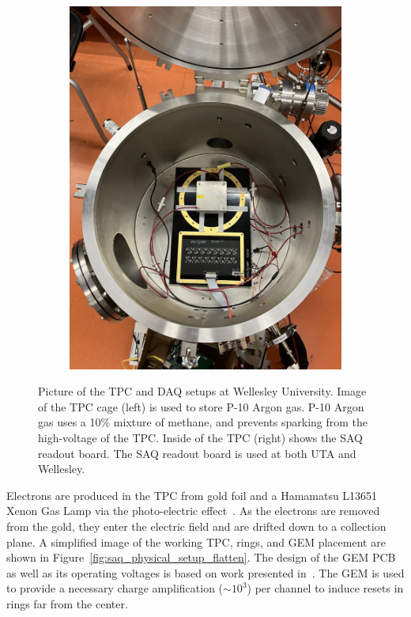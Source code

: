 \begin{figure}[]
\begin{subfigure}{.5\textwidth}
  \includegraphics[width=\textwidth]{images/saq_wellesley_tpc_daq.jpg}
  \caption{}
\end{subfigure}
\caption{Picture of the TPC and DAQ setups at Wellesley University.
Image of the TPC cage (left) is used to store P-10 Argon gas. P-10 Argon gas uses a 10\% mixture of methane, and prevents sparking from the high-voltage of the TPC.
Inside of the TPC (right) shows the SAQ readout board.
The SAQ readout board is used at both UTA and Wellesley.
}
\label{fig:wellesley_tpc}
\end{figure}

Electrons are produced in the TPC from gold foil and a Hamamatsu L13651~\citep{hamamatsu_tls1023e} Xenon Gas Lamp via the photo-electric effect~\citep{https://doi.org/10.1002/andp.19053220607}.
As the electrons are removed from the gold, they enter the electric field and are drifted down to a collection plane.
A simplified image of the working TPC, rings, and GEM placement are shown in Figure~\ref{fig:saq_physical_setup_flatten}.
The design of the GEM PCB as well as its operating voltages is based on work presented in~\citep{THORPE2023167438}.
The GEM is used to provide a necessary charge amplification ($\sim 10^{3}$) per channel to induce resets in rings far from the center.

